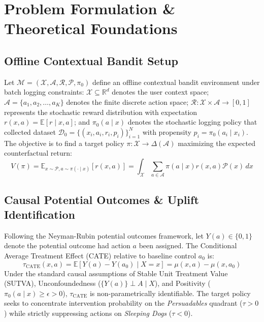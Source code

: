 \documentclass[preprint,12pt,3p]{elsarticle}
\begin{document}
\section{Problem Formulation \& Theoretical Foundations}
\label{sec:problem}

\subsection{Offline Contextual Bandit Setup}
Let $\mathcal{M} = (\mathcal{X}, \mathcal{A}, \mathcal{R}, \mathcal{P}, \pi_0)$ define an offline contextual bandit environment under batch logging constraints:
$\mathcal{X} \subseteq \mathbb{R}^d$ denotes the user context space; $\mathcal{A} = \{a_1, a_2, \dots, a_K\}$ denotes the finite discrete action space; $\mathcal{R}: \mathcal{X} \times \mathcal{A} \to [0, 1]$ represents the stochastic reward distribution with expectation $r(x, a) = \mathbb{E}[r \mid x, a]$; and $\pi_0(a \mid x)$ denotes the stochastic logging policy that collected dataset $\mathcal{D}_0 = \{ (x_i, a_i, r_i, p_i) \}_{i=1}^N$ with propensity $p_i = \pi_0(a_i \mid x_i)$. The objective is to find a target policy $\pi: \mathcal{X} \to \Delta(\mathcal{A})$ maximizing the expected counterfactual return:
\begin{equation}
V(\pi) = \mathbb{E}_{x \sim \mathcal{P}, a \sim \pi(\cdot \mid x)} \left[ r(x, a) \right] = \int_{\mathcal{X}} \sum_{a \in \mathcal{A}} \pi(a \mid x) r(x, a) \mathcal{P}(x) \, dx
\end{equation}

\subsection{Causal Potential Outcomes \& Uplift Identification}
Following the Neyman-Rubin potential outcomes framework, let $Y(a) \in \{0, 1\}$ denote the potential outcome had action $a$ been assigned. The Conditional Average Treatment Effect (CATE) relative to baseline control $a_0$ is:
\begin{equation}
\tau_{\mathrm{CATE}}(x, a) = \mathbb{E}[Y(a) - Y(a_0) \mid X = x] = \mu(x, a) - \mu(x, a_0)
\end{equation}
Under the standard causal assumptions of Stable Unit Treatment Value (SUTVA), Unconfoundedness ($\{Y(a)\} \perp A \mid X$), and Positivity ($\pi_0(a \mid x) \ge \epsilon > 0$), $\tau_{\mathrm{CATE}}$ is non-parametrically identifiable. The target policy seeks to concentrate intervention probability on the \textit{Persuadables} quadrant ($\tau > 0$) while strictly suppressing actions on \textit{Sleeping Dogs} ($\tau < 0$).
\end{document}
